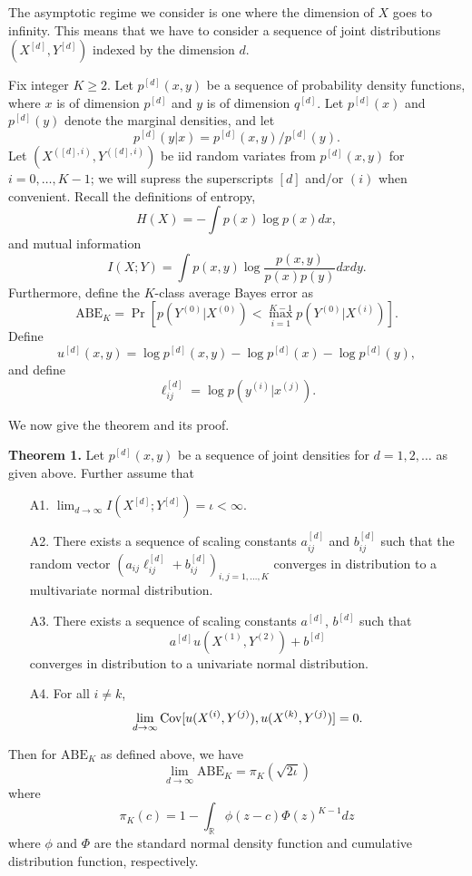 \documentclass[12pt]{article}
\begin{document}
The asymptotic regime we consider is one where the dimension of $X$ goes to infinity.
This means that we have to consider a sequence of joint distributions $(X^{[d]}, Y^{[d]})$ indexed by the dimension $d$.

Fix integer $K \geq 2$.  Let $p^{[d]}(x,y)$ be a sequence of
probability density functions, where $x$ is of dimension $p^{[d]}$ and
$y$ is of dimension $q^{[d]}$.  Let $p^{[d]}(x)$ and $p^{[d]}(y)$
denote the marginal densities, and let
\[
p^{[d]}(y|x) = p^{[d]}(x, y)/p^{[d]}(y).\]
 Let $(X^{([d], i)}, Y^{([d], i)})$ be
iid random variates from $p^{[d]}(x, y)$ for $i = 0, \hdots, K-1$; we will supress the
superscripts $[d]$ and/or $(i)$ when convenient.  Recall the definitions of
entropy,
\[
H(X) = -\int p(x) \log p(x) dx,
\]
and mutual information
\[
I(X; Y) = \int p(x, y) \log \frac{p(x, y)}{p(x)p(y)} dx dy.
\]
Furthermore, define the $K$-class average Bayes error as
\[
\text{ABE}_K = \Pr[p(Y^{(0)}|X^{(0)}) < \max_{i = 1}^{K-1} p(Y^{(0)}|X^{(i)})].
\]
Define
\[
u^{[d]}(x, y) = \log p^{[d]}(x, y) - \log p^{[d]}(x) - \log p^{[d]}(y),
\]
and define
\[
\ell_{ij}^{[d]} = \log p(y^{(i)}|x^{(j)}).
\]



We now give the theorem and its proof.

\textbf{Theorem 1.} Let $p^{[d]}(x, y)$ be a sequence of joint densities
for $d = 1,2,\hdots$ as given above.  Further assume that
\begin{itemize}
\item[A1.] $\lim_{d \to \infty} I(X^{[d]}; Y^{[d]}) = \iota < \infty.$
\item[A2.] There exists a sequence of scaling constants $a_{ij}^{[d]}$
and $b_{ij}^{[d]}$ such that the random vector $(a_{ij}\ell_{ij}^{[d]} +
b_{ij}^{[d]})_{i, j = 1,\hdots, K}$ converges in distribution to a
multivariate normal distribution.
\item[A3.] There exists a sequence of scaling constants $a^{[d]}$, $b^{[d]}$ such that
\[
a^{[d]}u(X^{(1)}, Y^{(2)}) + b^{[d]}
\]
converges in distribution to a univariate normal distribution.
\item[A4.] For all $i \neq k$,
\[\lim_{d \to \infty}\text{Cov}[u(X^{(i)}, Y^{(j)}), u(X^{(k)}, Y^{(j)})] = 0.\]
\end{itemize}
Then for $\text{ABE}_K$ as defined above, we have
\[
\lim_{d \to \infty} \text{ABE}_{K} = \pi_K(\sqrt{2 \iota})
\]
where
\[
\pi_K(c) = 1 - \int_{\mathbb{R}} \phi(z - c)  \Phi(z)^{K-1} dz
\]
where $\phi$ and $\Phi$ are the standard normal density function and
cumulative distribution function, respectively.
\end{document}
